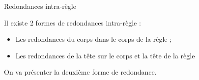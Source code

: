 \begin{comment}



\begin{frame}{Redondances intra-règle}
     Deux formes de redondances statiques étudiées :

    \begin{itemize}
    \color{red}
        \item Les redondances intra-règle 
        \color{black}
        \item Les redondances inter-règle 
       
    \end{itemize}
\end{frame}{}

\end{comment}

\begin{frame}{Redondances intra-règle}

    Il existe 2 formes de redondances intra-règle :

    \begin{itemize}
        \item Les redondances du corps dans le corps de la règle ; 
        \item Les redondances de la tête sur le corps et la tête de la règle
    \end{itemize}
    
    On va présenter la deuxième forme de redondance.
   
\end{frame}


%
    
    
    

